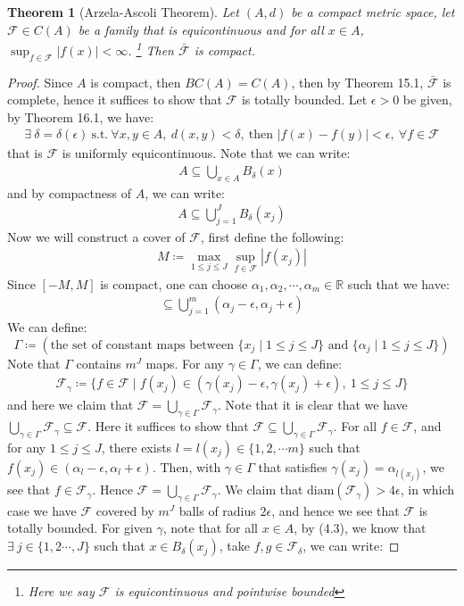 \documentclass[11pt]{book}
\theoremstyle{break}
\theoremstyle{break}
\newtheorem{thm}{Theorem}[section]
\newcommand{\R}{\mathbb{R}}
\newcommand{\F}{\mathcal{F}}
\begin{document}
\newpage
\begin{thm}[Arzela-Ascoli Theorem]
Let $(A,d)$ be a compact metric space, let $\F \in C(A)$ be a family that is equicontinuous and for all $x \in A$, $\sup_{f \in \F}|f(x)| <\infty$. \footnote{Here we say $\F$ is equicontinuous and pointwise bounded} Then $\bar{\F}$ is compact. 
\end{thm}
\begin{proof}
Since $A$ is compact, then $BC(A) = C(A)$, then by Theorem 15.1, $\bar{\F}$ is complete, hence it suffices to show that $\F$ is totally bounded. Let $\epsilon>0$ be given, by Theorem 16.1, we have:
\begin{align}
\exists\ \delta = \delta(\epsilon)\ \text{s.t.}\ \forall x,y \in A,\ d(x,y) < \delta, \ \text{then }|f(x) - f(y)|<\epsilon,\ \forall f \in \F
\end{align}
that is $\F$ is uniformly equicontinuous. Note that we can write:
\begin{align*}
A \subseteq \bigcup_{x \in A} B_{\delta}(x)
\end{align*}
and by compactness of $A$, we can write:
\begin{align}
A \subseteq \bigcup_{j=1}^J B_\delta (x_j)
\end{align}
Now we will construct a cover of $\F$, first define the following:
\begin{align*}
M \coloneqq \max_{1\leq j \leq J} \sup_{f \in \F}|f(x_j)|
\end{align*}
Since $[-M, M]$ is compact, one can choose $\alpha_1, \alpha_2,\cdots, \alpha_m \in \R$ such that we have:
\begin{align}
[-M, M] \subseteq \bigcup_{j=1}^m (\alpha_j -\epsilon , \alpha_j + \epsilon)
\end{align}
We can define: 
$$\Gamma \coloneqq (\text{the set of constant maps between }\{x_j \mid 1\leq j\leq J\} \text{ and }\{\alpha_j \mid 1\leq j \leq J\})$$
Note that $\Gamma$ contains $m^J$ maps. For any $\gamma \in \Gamma$, we can define:
\begin{align}
\F_{\gamma}\coloneqq \{ f\in \F \mid f(x_j) \in (\gamma(x_j) - \epsilon , \gamma(x_j) + \epsilon) , \ 1\leq j \leq J\}
\end{align}
and here we claim that $\F = \bigcup_{\gamma \in \Gamma}\F_\gamma$. Note that it is clear that we have $\bigcup_{\gamma \in \Gamma}\F_\gamma \subseteq \F$. Here it suffices to show that $\F \subseteq \bigcup_{\gamma \in \Gamma} \F_\gamma$. For all $f \in \F$, and for any $1\leq j\leq J$, there exists $l =l(x_j) \in \{1,2,\cdots m\}$ such that $f(x_j) \in (\alpha_l-\epsilon, \alpha_l + \epsilon)$. Then, with $\gamma \in \Gamma$ that satisfies $\gamma(x_j) = \alpha_{l(x_j)}$, we see that $f \in \F_\gamma$. Hence $\F = \bigcup_{\gamma \in \Gamma}\F_\gamma$. We claim that $\text{diam}(\F_\gamma) > 4\epsilon$, in which case we have $\F$ covered by $m^J$ balls of radius $2\epsilon$, and hence we see that $\F$ is totally bounded. For given $\gamma$, note that for all $x\in A$, by (4.3), we know that $\exists\ j \in \{1,2 \cdots, J\}$ such that $x \in B_{\delta}(x_j)$, take $f,g \in \F_{\delta}$, we can write:

\end{proof}
\end{document}
